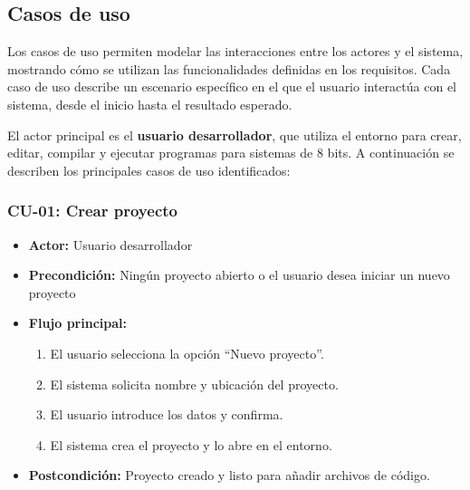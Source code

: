 \documentclass[../../main.tex]{subfiles}
\begin{document}
\subsection{Casos de uso}

\par{Los casos de uso permiten modelar las interacciones entre los actores y el sistema, mostrando cómo se utilizan las funcionalidades definidas en los requisitos. Cada caso de uso describe un escenario específico en el que el usuario interactúa con el sistema, desde el inicio hasta el resultado esperado.}

\par{El actor principal es el \textbf{usuario desarrollador}, que utiliza el entorno para crear, editar, compilar y ejecutar programas para sistemas de 8 bits. A continuación se describen los principales casos de uso identificados:}

\subsubsection*{CU-01: Crear proyecto}
\begin{itemize}
    \item \textbf{Actor:} Usuario desarrollador
    \item \textbf{Precondición:} Ningún proyecto abierto o el usuario desea iniciar un nuevo proyecto
    \item \textbf{Flujo principal:}
        \begin{enumerate}
            \item El usuario selecciona la opción ``Nuevo proyecto''.
            \item El sistema solicita nombre y ubicación del proyecto.
            \item El usuario introduce los datos y confirma.
            \item El sistema crea el proyecto y lo abre en el entorno.
        \end{enumerate}
    \item \textbf{Postcondición:} Proyecto creado y listo para añadir archivos de código.
\end{itemize}
\end{document}
